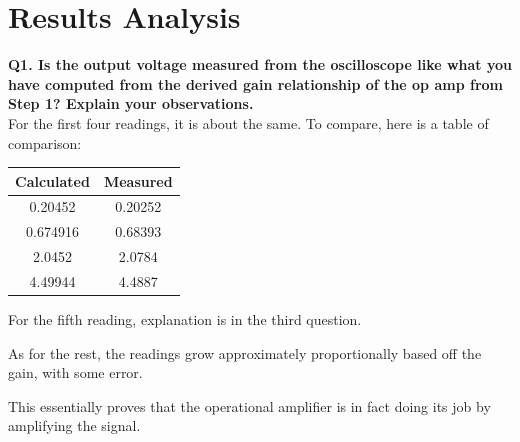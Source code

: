 \documentclass[a4paper,12pt,oneside, tikz]{book}
\begin{document}
\section{Results Analysis}
\begin{tcolorbox}
\textbf{Q1. Is the output voltage measured from the oscilloscope like what you have computed from the derived gain relationship of the op amp from Step 1? Explain your observations.} \\

For the first four readings, it is about the same. To compare, here is a table of comparison:

\begin{center}
    \begin{tabular}{|c|c|}
 \hline Calculated & Measured \\
 \hline 0.20452 & 0.20252 \\
        0.674916 & 0.68393 \\
        2.0452 & 2.0784 \\
        4.49944 & 4.4887 \\
 \hline
    \end{tabular}
\end{center}

For the fifth reading, explanation is in the third question.

As for the rest, the readings grow approximately proportionally based off the gain, with some error.

This essentially proves that the operational amplifier is in fact doing its job by amplifying the signal.
\end{tcolorbox}
\end{document}
